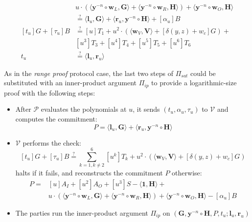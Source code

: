 \documentclass[../lecture-notes-148x210.tex]{subfiles}
\begin{document}
\begin{definition}
\begin{itemize}
\begin{equation*}
\begin{aligned}
                    &u \cdot (\langle \mathbf{y}^{-n} \circ \mathbf{w}_L, \mathbf{G} \rangle + \langle \mathbf{y}^{-n} \circ \mathbf{w}_R, \mathbf{H} \rangle) + \langle \mathbf{y}^{-n} \circ \mathbf{w}_O, \mathbf{H} \rangle \\
                    &\stackrel{\text{?}}{=} \langle \mathbf{l}_u, \mathbf{G} \rangle + \langle \mathbf{r}_u, \mathbf{y}^{-n} \circ \mathbf{H} \rangle + [\alpha_u]B\\
                    [t_u]G + [\tau_u]B &\stackrel{\text{?}}{=} [u]T_1 + u^2 \cdot (\langle \mathbf{w}_V, \mathbf{V} \rangle + [\delta(y,z) + w_c]G) +\\
                    &[u^3]T_3 + [u^4]T_4 + [u^5]T_5 + [u^6]T_6\\
                    t_u &\stackrel{\text{?}}{=} \langle \mathbf{l}_u, \mathbf{r}_u \rangle
                \end{aligned}
            \end{equation*}
    \end{itemize}
\end{definition}

\begin{remark}
    As in the \textit{range proof} protocol case, the last two steps of $\Pi_{sat}$ could be substituted with an inner-product argument $\Pi_{ip}$ to provide a logarithmic-size proof with the following steps:
    \begin{itemize}
        \item After $\mathcal{P}$ evaluates the polynomials at $u$, it sends $(t_u, \alpha_u, \tau_u)$ to $\mathcal{V}$ and computes the commitment:
        $$P = \langle \mathbf{l}_u, \mathbf{G} \rangle + \langle \mathbf{r}_u, \mathbf{y}^{-n} \circ \mathbf{H} \rangle$$
        \item $\mathcal{V}$ performs the check:
        $$
            [t_u]G + [\tau_u]B \stackrel{\text{?}}{=} \sum_{k=1, k\neq 2}^6 [u^k]T_k + u^2 \cdot (\langle \mathbf{w}_V, \mathbf{V} \rangle + [\delta(y,z) + w_c]G)
        $$
        halts if it fails, and reconstructs the commitment $P$ otherwise:
        \begin{align*}
            P =& [u]A_I + [u^2]A_O + [u^3]S - \langle \mathbf{1}, \mathbf{H} \rangle +\\
                &u \cdot (\langle \mathbf{y}^{-n} \circ \mathbf{w}_L, \mathbf{G} \rangle + \langle \mathbf{y}^{-n} \circ \mathbf{w}_R, \mathbf{H} \rangle) + \langle \mathbf{y}^{-n} \circ \mathbf{w}_O, \mathbf{H} \rangle - [\alpha_u]B
        \end{align*}
        \item The parties run the inner-product argument $\Pi_{ip}$ on $(\mathbf{G},\mathbf{y}^{-n} \circ \mathbf{H}, P, t_u; \mathbf{l}_u, \mathbf{r}_u)$
    \end{itemize}
\end{remark}
\end{document}
